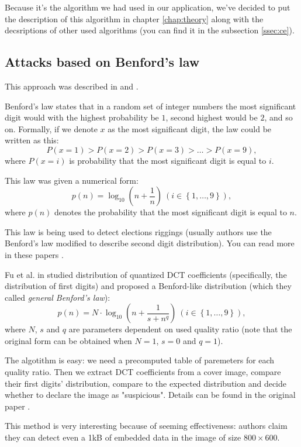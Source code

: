 Because it's the algorithm we had used in our application, 
we've decided to put the description of this algorithm in chapter \ref{chap:theory}
along with the decsriptions of other used algorithms (you can find it in the subsection
\ref{ssec:ce}).

\subsection{Attacks based on Benford's law}

This approach was described in \cite{andriotis2013two} and \cite{andriotis2013jpeg}.

Benford's law states that in a random set of integer numbers the most significant digit would
with the highest probability be $1$, second highest would be $2$, and so on. Formally, if we denote $x$
as the most significant digit, the law could be written as this:
$$P(x = 1) > P(x = 2) > P(x = 3) > \ldots > P(x = 9),$$
where $P(x = i)$ is probability that the most significant digit is equal to $i$.

This law was given a numerical form:
$$p(n) = \log_{10}\left(n + \frac{1}{n}\right) ~\left(i \in \left\{ 1, \ldots , 9 \right\}\right),$$
where $p(n)$ denotes the probability that the most significant digit is equal to $n$.

This law is being used to detect elections riggings (usually authors use the Benford's law modified to 
describe second digit distribution). You can read more in these papers
\cite{mebane2006election, roukema2009benford, deckert2011benford}.

Fu et al. in \cite{fu2007generalized} studied distribution of quantized DCT coefficients (specifically, the distribution of first digits)
and proposed a Benford-like distribution (which they called \emph{general Benford's law}):
$$p(n) = N \cdot \log_{10}\left(n + \frac{1}{s + n^q}\right) ~\left(i \in \left\{ 1, \ldots , 9 \right\}\right), $$
where $N$, $s$ and $q$ are parameters dependent on used quality ratio (note that the original form can be obtained when
$N = 1$, $s = 0$ and $q = 1$).

The algotithm is easy: we need a precomputed table of paremeters for each quality ratio. Then we extract DCT coefficients
from a cover image, compare their first digits' distribution, compare to the expected distribution and decide whether to
declare the image as "suspicious". Details can be found in the original paper \cite{andriotis2013two}.

This method is very interesting because of seeming effectiveness: authors claim they can detect even a 1kB of embedded data
in the image of size $800 \times 600$.

